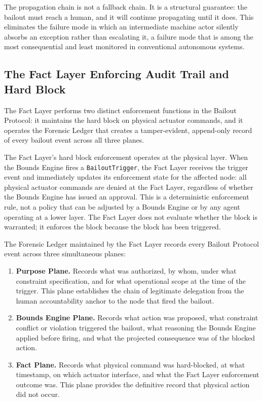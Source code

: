 The propagation chain is not a fallback chain. It is a structural guarantee: the bailout must reach a human, and it will continue propagating until it does. This eliminates the failure mode in which an intermediate machine actor silently absorbs an exception rather than escalating it, a failure mode that is among the most consequential and least monitored in conventional autonomous systems.

\subsection{The Fact Layer Enforcing Audit Trail and Hard Block}
\label{sec:fact-layer-audit}

The Fact Layer performs two distinct enforcement functions in the Bailout Protocol: it maintains the hard block on physical actuator commands, and it operates the Forensic Ledger that creates a tamper-evident, append-only record of every bailout event across all three planes.

The Fact Layer's hard block enforcement operates at the physical layer. When the Bounds Engine fires a \texttt{BailoutTrigger}, the Fact Layer receives the trigger event and immediately updates its enforcement state for the affected node: all physical actuator commands are denied at the Fact Layer, regardless of whether the Bounds Engine has issued an approval. This is a deterministic enforcement rule, not a policy that can be adjusted by a Bounds Engine or by any agent operating at a lower layer. The Fact Layer does not evaluate whether the block is warranted; it enforces the block because the block has been triggered.

The Forensic Ledger maintained by the Fact Layer records every Bailout Protocol event across three simultaneous planes:

\begin{enumerate}
\item \textbf{Purpose Plane.} Records what was authorized, by whom, under what constraint specification, and for what operational scope at the time of the trigger. This plane establishes the chain of legitimate delegation from the human accountability anchor to the node that fired the bailout.
\item \textbf{Bounds Engine Plane.} Records what action was proposed, what constraint conflict or violation triggered the bailout, what reasoning the Bounds Engine applied before firing, and what the projected consequence was of the blocked action.
\item \textbf{Fact Plane.} Records what physical command was hard-blocked, at what timestamp, on which actuator interface, and what the Fact Layer enforcement outcome was. This plane provides the definitive record that physical action did not occur.
\end{enumerate}

